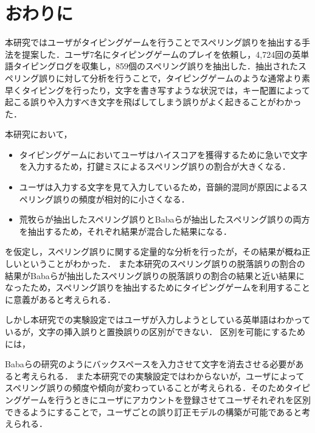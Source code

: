 \chapter{おわりに}
本研究ではユーザがタイピングゲームを行うことでスペリング誤りを抽出する手法を提案した．ユーザ7名にタイピングゲームのプレイを依頼し，4,724回の英単語タイピングログを収集し，859個のスペリング誤りを抽出した．抽出されたスペリング誤りに対して分析を行うことで，タイピングゲームのような通常より素早くタイピングを行ったり，文字を書き写すような状況では，キー配置によって起こる誤りや入力すべき文字を飛ばしてしまう誤りがよく起きることがわかった．

本研究において，

\begin{itemize}
 \item タイピングゲームにおいてユーザはハイスコアを獲得するために急いで文字を入力するため，打鍵ミスによるスペリング誤りの割合が大きくなる．
 \item ユーザは入力する文字を見て入力しているため，音韻的混同が原因によるスペリング誤りの頻度が相対的に小さくなる．
 \item 荒牧らが抽出したスペリング誤り\cite{aramakiNLP2010}とBabaらが抽出したスペリング誤り\cite{babaACL2012}の両方を抽出するため，それぞれ結果が混合した結果になる．
\end{itemize}

を仮定し，スペリング誤りに関する定量的な分析を行ったが，その結果が概ね正しいということがわかった．
また本研究のスペリング誤りの脱落誤りの割合の結果がBabaらが抽出したスペリング誤りの脱落誤りの割合の結果\cite{babaACL2012}と近い結果になったため，スペリング誤りを抽出するためにタイピングゲームを利用することに意義があると考えられる．

しかし本研究での実験設定ではユーザが入力しようとしている英単語はわかっているが，文字の挿入誤りと置換誤りの区別ができない．
区別を可能にするためには，
\begin{comment}
タイピングゲームにおいて入力した文字列が正しいかどうか判定するときにエンターキーを入力させて英単語に対応する文字列を明確にする，
\end{comment}
Babaらの研究\cite{babaACL2012}のようにバックスペースを入力させて文字を消去させる必要があると考えられる．
また本研究での実験設定ではわからないが，ユーザによってスペリング誤りの頻度や傾向が変わっていることが考えられる．そのためタイピングゲームを行うときにユーザにアカウントを登録させてユーザそれぞれを区別できるようにすることで，ユーザごとの誤り訂正モデルの構築が可能であると考えられる．

